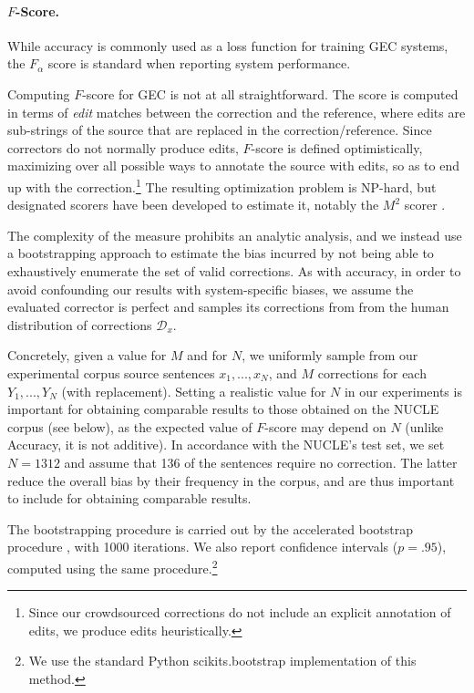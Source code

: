 \documentclass[letter,11pt]{article}
\begin{document}
\paragraph{$F$-Score.}
While accuracy is commonly used as a loss function for training GEC systems,
the $F_\alpha$ score is standard when reporting system performance.

Computing $F$-score for GEC is not at all straightforward.
The score is computed in terms of {\it edit} matches between the correction and the reference,
where edits are sub-strings of the source that are replaced in the correction/reference.
Since correctors do not normally produce edits, $F$-score is defined optimistically, maximizing
over all possible ways to annotate the source with edits,
so as to end up with the correction.\footnote{Since our crowdsourced corrections
  do not include an explicit annotation of edits, we produce edits heuristically.}
The resulting optimization problem is NP-hard, but designated scorers
have been developed to estimate it, notably the $M^2$ scorer 
\cite{dahlmeier2012better}.

The complexity of the measure prohibits an analytic analysis, and
we instead use a bootstrapping approach to estimate the bias incurred
by not being able to exhaustively enumerate the set of valid corrections.
As with accuracy,
in order to avoid confounding our results with system-specific biases,
we assume the evaluated corrector is perfect and samples its corrections from
from the human distribution of corrections $\mathcal{D}_x$.

Concretely, given a value for $M$ and for $N$, we uniformly sample from our experimental
corpus source sentences $x_1,...,x_N$, and $M$ corrections for each $Y_1,...,Y_N$ (with replacement).
Setting a realistic value for $N$ in our experiments is important
for obtaining comparable results to those obtained on the NUCLE corpus (see below), 
as the expected value of $F$-score may depend on $N$ (unlike Accuracy, it is not additive).
In accordance with the NUCLE's test set,
we set $N=1312$ and assume that 136 of the sentences require no correction.
The latter reduce the overall bias by their frequency in the corpus,
and are thus important to include for obtaining comparable results.

The bootstrapping procedure is carried out by the
accelerated bootstrap procedure \cite{efron1987better}, with 1000 iterations.
We also report confidence intervals ($p=.95$), computed using the same procedure.\footnote{We
  use the standard Python scikits.bootstrap implementation of this method.}
\end{document}
